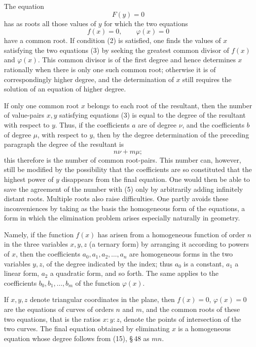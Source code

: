 \documentclass[11pt]{article}
\begin{document}
The equation
\begin{equation}
F(y)=0
\tag{2}
\end{equation}
has as roots all those values of $y$ for which the two equations
\begin{equation}
f(x)=0,
\qquad
\varphi(x)=0
\tag{3}
\end{equation}
have a common root. If condition (2) is satisfied, one finds the values of $x$ satisfying the two equations (3) by seeking the greatest common divisor of $f(x)$ and $\varphi(x)$. This common divisor is of the first degree and hence determines $x$ rationally when there is only one such common root; otherwise it is of correspondingly higher degree, and the determination of $x$ still requires the solution of an equation of higher degree.

If only one common root $x$ belongs to each root of the resultant, then the number of value-pairs $x,y$ satisfying equations (3) is equal to the degree of the resultant with respect to $y$. Thus, if the coefficients $a$ are of degree $\nu$, and the coefficients $b$ of degree $\mu$, with respect to $y$, then by the degree determination of the preceding paragraph the degree of the resultant is
\begin{equation}
n\nu+m\mu;
\tag{5}
\end{equation}
this therefore is the number of common root-pairs. This number can, however, still be modified by the possibility that the coefficients are so constituted that the highest power of $y$ disappears from the final equation. One would then be able to save the agreement of the number with (5) only by arbitrarily adding infinitely distant roots. Multiple roots also raise difficulties. One partly avoids these inconveniences by taking as the basis the homogeneous form of the equations, a form in which the elimination problem arises especially naturally in geometry.

Namely, if the function $f(x)$ has arisen from a homogeneous function of order $n$ in the three variables $x,y,z$ (a ternary form) by arranging it according to powers of $x$, then the coefficients $a_0,a_1,a_2,\ldots,a_n$ are homogeneous forms in the two variables $y,z$, of the degree indicated by the index; thus $a_0$ is a constant, $a_1$ a linear form, $a_2$ a quadratic form, and so forth. The same applies to the coefficients $b_0,b_1,\ldots,b_m$ of the function $\varphi(x)$.

If $x,y,z$ denote triangular coordinates in the plane, then $f(x)=0$, $\varphi(x)=0$ are the equations of curves of orders $n$ and $m$, and the common roots of these two equations, that is the ratios $x:y:z$, denote the points of intersection of the two curves. The final equation obtained by eliminating $x$ is a homogeneous equation whose degree follows from (15), \S\,48 as $mn$.
\end{document}
